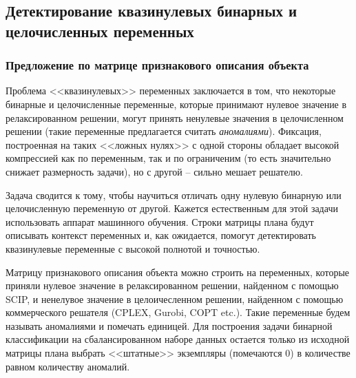 \documentclass[%
	11pt,
	a4paper,
	utf8,
		]{article}
\begin{document}
\subsection{Детектирование квазинулевых бинарных и целочисленных переменных}

\subsubsection{Предложение по матрице признакового описания объекта}

Проблема <<квазинулевых>> переменных заключается в том, что некоторые бинарные и целочисленные переменные, которые принимают нулевое значение в релаксированном решении, могут принять ненулевые значения в целочисленном решении (такие переменные предлагается считать \emph{аномалиями}). Фиксация, построенная на таких <<ложных нулях>> с одной стороны обладает высокой компрессией как по переменным, так и по ограниченим (то есть значительно снижает размерность задачи), но с другой -- сильно мешает решателю.

Задача сводится к тому, чтобы научиться отличать одну нулевую бинарную или целочисленную переменную от другой. Кажется естественным для этой задачи использовать аппарат машинного обучения. Строки матрицы плана будут описывать контекст переменных и, как ожидается, помогут детектировать квазинулевые переменные с высокой полнотой и точностью.

Матрицу признакового описания объекта можно строить на переменных, которые приняли нулевое значение в релаксированном решении, найденном с помощью SCIP, и ненелувое значение в целоичесленном решении, найденном с помощью коммерческого решателя (CPLEX, Gurobi, COPT etc.). Такие переменные будем называть аномалиями и помечать единицей. Для построения задачи бинарной классификации на сбалансированном наборе данных остается только из исходной матрицы плана выбрать <<штатные>> экземпляры (помечаются 0) в количестве равном количеству аномалий.
\end{document}
